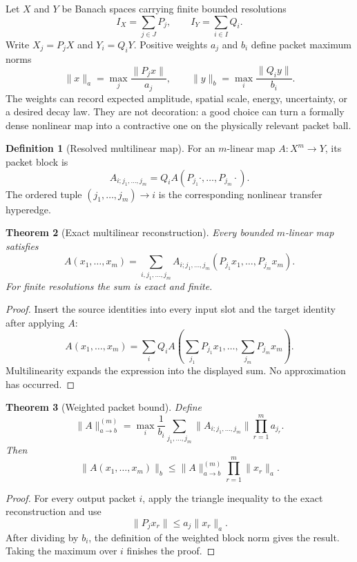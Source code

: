 \documentclass[11pt]{article}
\newtheorem{theorem}{Theorem}[section]
\theoremstyle{definition}
\newtheorem{definition}[theorem]{Definition}
\theoremstyle{remark}
\begin{document}
Let $X$ and $Y$ be Banach spaces carrying finite bounded resolutions
\[
I_X=\sum_{j\in J}P_j,
\qquad
I_Y=\sum_{i\in I}Q_i.
\]
Write $X_j=P_jX$ and $Y_i=Q_iY$.  Positive weights $a_j$ and $b_i$ define packet maximum norms
\[
\|x\|_a=\max_j\frac{\|P_jx\|}{a_j},
\qquad
\|y\|_b=\max_i\frac{\|Q_iy\|}{b_i}.
\]
The weights can record expected amplitude, spatial scale, energy, uncertainty, or a desired decay law.  They are not decoration: a good choice can turn a formally dense nonlinear map into a contractive one on the physically relevant packet ball.

\begin{definition}[Resolved multilinear map]
For an $m$-linear map $A:X^m\to Y$, its packet block is
\[
A_{i;j_1,\ldots,j_m}
=
Q_iA(P_{j_1}\cdot,\ldots,P_{j_m}\cdot).
\]
The ordered tuple $(j_1,\ldots,j_m)\to i$ is the corresponding nonlinear transfer hyperedge.
\end{definition}

\begin{theorem}[Exact multilinear reconstruction]
Every bounded $m$-linear map satisfies
\[
A(x_1,\ldots,x_m)
=
\sum_{i,j_1,\ldots,j_m}
A_{i;j_1,\ldots,j_m}
(P_{j_1}x_1,\ldots,P_{j_m}x_m).
\]
For finite resolutions the sum is exact and finite.
\end{theorem}

\begin{proof}
Insert the source identities into every input slot and the target identity after applying $A$:
\[
A(x_1,\ldots,x_m)
=
\sum_iQ_iA\left(\sum_{j_1}P_{j_1}x_1,\ldots,\sum_{j_m}P_{j_m}x_m\right).
\]
Multilinearity expands the expression into the displayed sum.  No approximation has occurred.
\end{proof}

\begin{theorem}[Weighted packet bound]
Define
\[
\|A\|^{(m)}_{a\to b}
=
\max_i\frac{1}{b_i}
\sum_{j_1,\ldots,j_m}
\|A_{i;j_1,\ldots,j_m}\|
\prod_{r=1}^ma_{j_r}.
\]
Then
\[
\|A(x_1,\ldots,x_m)\|_b
\le
\|A\|^{(m)}_{a\to b}
\prod_{r=1}^m\|x_r\|_a.
\]
\end{theorem}

\begin{proof}
For every output packet $i$, apply the triangle inequality to the exact reconstruction and use
\[
\|P_jx_r\|\le a_j\|x_r\|_a.
\]
After dividing by $b_i$, the definition of the weighted block norm gives the result.  Taking the maximum over $i$ finishes the proof.
\end{proof}
\end{document}
